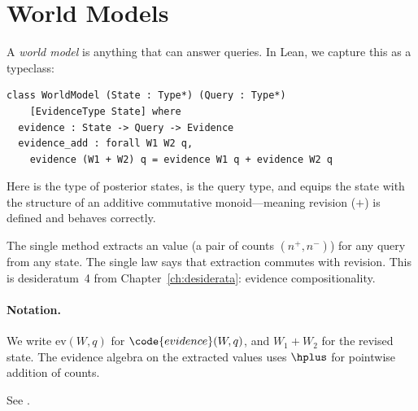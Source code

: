 \documentclass[11pt,openany]{report}
\begin{document}
\section{World Models}

A \emph{world model} is anything that can answer queries.  In Lean, we
capture this as a typeclass:

\begin{lstlisting}
class WorldModel (State : Type*) (Query : Type*)
    [EvidenceType State] where
  evidence : State -> Query -> Evidence
  evidence_add : forall W1 W2 q,
    evidence (W1 + W2) q = evidence W1 q + evidence W2 q
\end{lstlisting}

Here  is the type of posterior states,  is the
query type, and  equips the state with the structure of
an additive commutative monoid---meaning revision ($+$) is defined and
behaves correctly.

The single method  extracts an \Evidence{} value (a pair of
counts $(n^+, n^-)$) for any query from any state.  The single law
 says that extraction commutes with revision.  This is
desideratum~4 from Chapter~\ref{ch:desiderata}: evidence compositionality.

\paragraph{Notation.}
We write $\mathrm{ev}(W, q)$ for $\code{evidence}(W, q)$, and $W_1 + W_2$
for the revised state.  The evidence algebra on the extracted values uses
$\hplus$ for pointwise addition of counts.

See .
\end{document}

